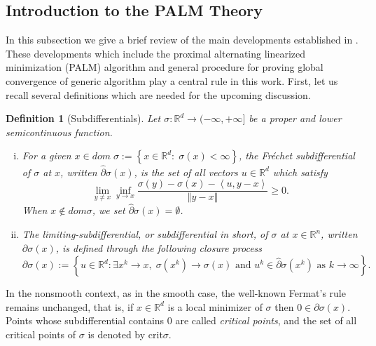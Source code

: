 \documentclass[12pt]{article}
\numberwithin{equation}{section}
\newtheorem{definition}{Definition}
\newcommand{\rr}{\mathbb{R}} %
\newcommand{\norm}[1]{\left\Vert {#1} \right\Vert} %
\begin{document}
\subsection{Introduction to the PALM Theory} \label{State_PALM_Theory}

In this subsection we give a brief review of the main developments established in \cite
{BST2014}. These developments which include the proximal alternating linearized minimization (PALM) algorithm and general procedure for proving global convergence of generic algorithm play a central rule in this work. First, let us recall several definitions which are needed for the upcoming discussion.

\begin{definition}[Subdifferentials]
	Let $\sigma : \rr^d \rightarrow (-\infty,+\infty]$ be a proper and lower semicontinuous function.
	\begin{enumerate}[(i)]
		\item For a given $x \in dom\;\sigma := \left\lbrace x \in \rr^d : \; \sigma(x) < \infty \right\rbrace$, the \textit{Fr\'echet subdifferential} of $\sigma$ at $x$, written $\widehat{\partial}\sigma(x)$, is the set of all vectors $u \in \rr^d$ which satisfy
		\begin{equation*}
			\lim\limits_{y \neq x} \inf\limits_{y \rightarrow x} \frac{\sigma(y) - \sigma(x) - \left\langle u, y-x \right\rangle}{\norm{y-x}} \geq 0.
		\end{equation*}
		When $x \notin dom\sigma$, we set $\widehat{\partial}\sigma(x) = \emptyset$.
		\item The \textit{limiting-subdifferential}, or subdifferential in short, of $\sigma$ at $x \in \rr^n$, written $\partial\sigma(x)$, is defined through the following closure process
		\begin{equation*}
			\partial\sigma(x) := \left\lbrace u \in \rr^d : \exists x^k \rightarrow x, \; \sigma(x^k)\rightarrow \sigma(x) \text{ and } u^k \in \widehat{\partial}\sigma(x^k) \text{ as } k \rightarrow \infty \right\rbrace.
		\end{equation*}
	\end{enumerate}
\end{definition}
In the nonsmooth context, as in the smooth case, the well-known Fermat's rule remains unchanged, that is, if $x \in \rr^d$ is a local minimizer of $\sigma$ then $0 \in \partial\sigma(x)$. Points whose subdifferential contains $0$ are called \textit{critical points}, and the set of all critical points of $\sigma$ is denoted by crit$\sigma$.
\end{document}
